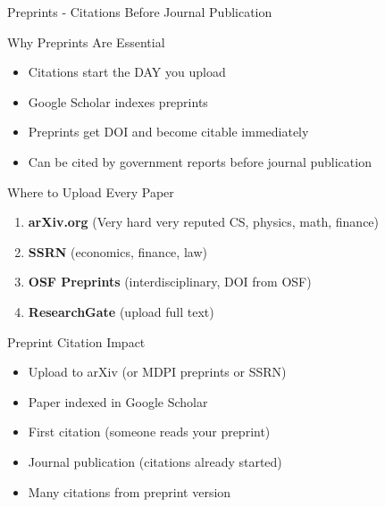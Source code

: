 \documentclass[11pt]{beamer}
\begin{document}
	\begin{frame}{Preprints - Citations Before Journal Publication}
		\scriptsize
		\begin{block}{Why Preprints Are Essential}
			\begin{itemize}
				\item Citations start the DAY you upload
				\item Google Scholar indexes preprints
				\item Preprints get DOI and become citable immediately
				\item Can be cited by government reports before journal publication
			\end{itemize}
		\end{block}
		\begin{block}{Where to Upload Every Paper}
			\begin{enumerate}
				\item \textbf{arXiv.org} (Very hard very reputed CS, physics, math, finance)
				\item \textbf{SSRN} (economics, finance, law)
				\item \textbf{OSF Preprints} (interdisciplinary, DOI from OSF)
				\item \textbf{ResearchGate} (upload full text)
			\end{enumerate}
		\end{block}
		\begin{block}{Preprint Citation Impact}
			\begin{itemize}
				\item Upload to arXiv (or MDPI preprints or SSRN)
				\item Paper indexed in Google Scholar
				\item First citation (someone reads your preprint)
				\item Journal publication (citations already started)
				\item Many citations from preprint version
			\end{itemize}
		\end{block}
	\end{frame}
	
\end{document}
